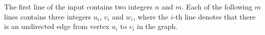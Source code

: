 The first line of the input contains two integers $n$ and $m$.
Each of the following $m$ lines contains three integers $u_i$, $v_i$ and $w_i$, where the $i$-th line denotes that there is an undirected edge from vertex $u_i$ to $v_i$ in the graph.